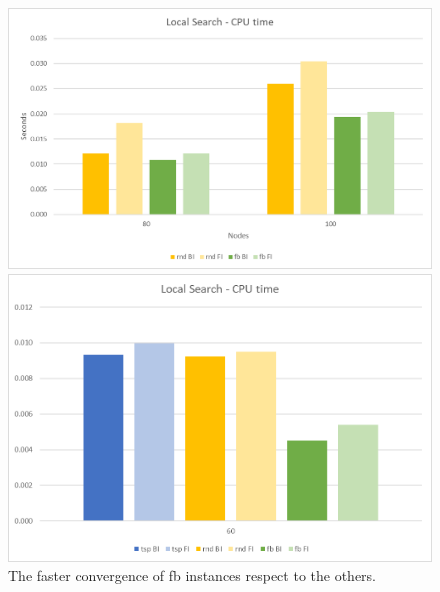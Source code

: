 	\begin{figure}[H]
		\centering
		
		\includegraphics[width=\linewidth]{img/LS-convergence}
		
		\vspace{1cm}
		
		\includegraphics[width=\linewidth]{img/LS-convergence60}
		
		\caption{The faster convergence of fb instances respect to the others.}
		\label{fig:ls-convergence}
	\end{figure}
	
\newpage
	
